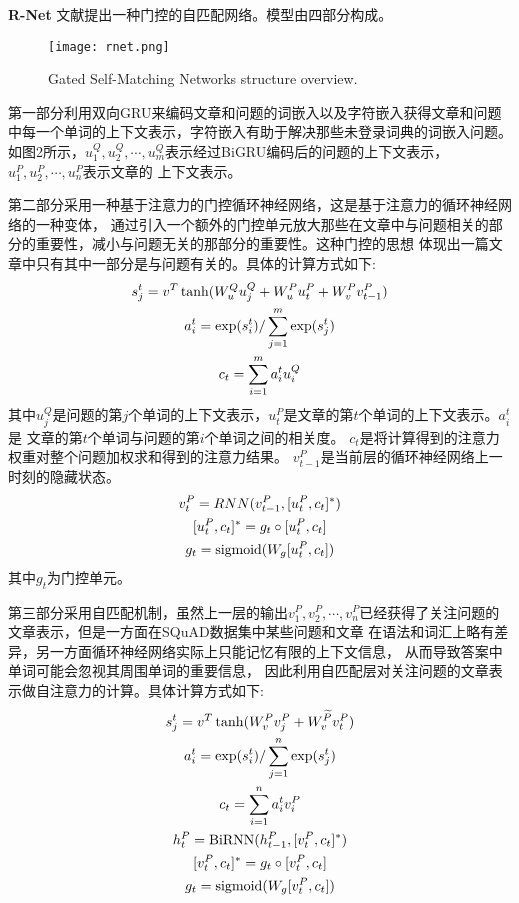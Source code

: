\textbf{\songti {} R-Net}
文献提出一种门控的自匹配网络。模型由四部分构成。

\begin{figure}[htbp]
    \centering
    \texttt{[image: rnet.png]}
    \caption{Gated Self-Matching Networks structure overview.}
\end{figure}

第一部分利用双向GRU来编码文章和问题的词嵌入以及字符嵌入获得文章和问题中每一个单词的上下文表示，字符嵌入有助于解决那些未登录词典的词嵌入问题。
如图2所示，$u_1^Q,u_2^Q,\cdots,u_m^Q$表示经过BiGRU编码后的问题的上下文表示，$u_1^P,u_2^P,\cdots,u_n^P$表示文章的
上下文表示。

第二部分采用一种基于注意力的门控循环神经网络，这是基于注意力的循环神经网络的一种变体，
通过引入一个额外的门控单元放大那些在文章中与问题相关的部分的重要性，减小与问题无关的那部分的重要性。这种门控的思想
体现出一篇文章中只有其中一部分是与问题有关的。具体的计算方式如下:
\begin{gather}
    s_j^t=v^T\tanh(W_u^Qu_j^Q+W_u^Pu_t^P+W_v^Pv_{t-1}^P) \notag \\
    a_i^t=\exp(s_i^t)/\sum_{j=1}^{m}\exp(s_j^t)\notag \\
    c_t=\sum_{i=1}^{m}a_i^tu_i^Q \notag
\end{gather}
其中$u_j^Q$是问题的第$j$个单词的上下文表示，$u_t^P$是文章的第$t$个单词的上下文表示。$a_i^t$是
文章的第$t$个单词与问题的第$i$个单词之间的相关度。
$c_t$是将计算得到的注意力权重对整个问题加权求和得到的注意力结果。
$v_{t-1}^P$是当前层的循环神经网络上一时刻的隐藏状态。
\begin{gather}
    v_t^P=RNN(v_{t-1}^P,[u_t^P,c_t]^{*}) \notag \\
    [u_t^P,c_t]^{*}=g_t\circ [u_t^P,c_t] \notag \\
    g_t=\text{sigmoid}(W_g[u_t^P,c_t]) \notag 
\end{gather}
其中$g_t$为门控单元。

第三部分采用自匹配机制，虽然上一层的输出$v_1^P,v_2^P,\cdots,v_n^P$已经获得了关注问题的文章表示，但是一方面在SQuAD数据集中某些问题和文章
在语法和词汇上略有差异，另一方面循环神经网络实际上只能记忆有限的上下文信息，
从而导致答案中单词可能会忽视其周围单词的重要信息，
因此利用自匹配层对关注问题的文章表示做自注意力的计算。具体计算方式如下:
\begin{gather}
    s_j^t=v^T\tanh(W_v^Pv_j^P+W_v^{\widetilde{P}}v_t^P)\notag \\
    a_i^t=\exp(s_i^t)/\sum_{j=1}^{n}\exp(s_j^t)\notag \\
    c_t=\sum_{i=1}^{n}a_i^tv_i^P \notag \\    
    h_t^P=\text{BiRNN}(h_{t-1}^P,[v_t^P,c_t]^{*}) \notag \\
    [v_t^P,c_t]^{*}=g_t\circ [v_t^P,c_t] \notag \\
    g_t=\text{sigmoid}(W_g[v_t^P,c_t])\notag
\end{gather}\notag


